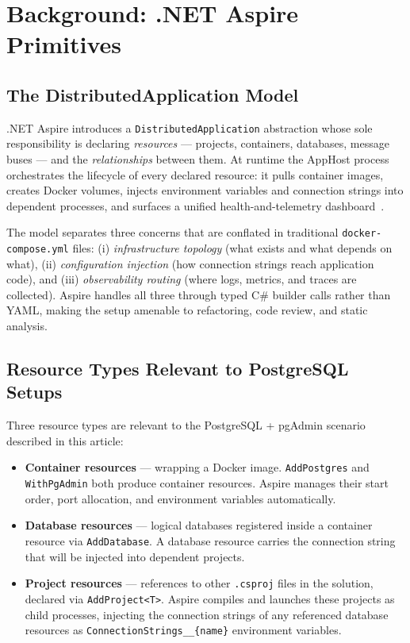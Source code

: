 \section{Background: .NET Aspire Primitives}
\label{sec:background}

\subsection{The DistributedApplication Model}

.NET Aspire introduces a \texttt{DistributedApplication} abstraction whose sole responsibility is declaring \textit{resources} --- projects, containers, databases, message buses --- and the \textit{relationships} between them. At runtime the AppHost process orchestrates the lifecycle of every declared resource: it pulls container images, creates Docker volumes, injects environment variables and connection strings into dependent processes, and surfaces a unified health-and-telemetry dashboard~\cite{aspiredocs2024}.

The model separates three concerns that are conflated in traditional \texttt{docker-compose.yml} files: (i) \textit{infrastructure topology} (what exists and what depends on what), (ii) \textit{configuration injection} (how connection strings reach application code), and (iii) \textit{observability routing} (where logs, metrics, and traces are collected). Aspire handles all three through typed C\# builder calls rather than YAML, making the setup amenable to refactoring, code review, and static analysis.

\subsection{Resource Types Relevant to PostgreSQL Setups}

Three resource types are relevant to the PostgreSQL + pgAdmin scenario described in this article:

\begin{itemize}
  \item \textbf{Container resources} --- wrapping a Docker image. \texttt{AddPostgres} and \texttt{WithPgAdmin} both produce container resources. Aspire manages their start order, port allocation, and environment variables automatically.
  \item \textbf{Database resources} --- logical databases registered inside a container resource via \texttt{AddDatabase}. A database resource carries the connection string that will be injected into dependent projects.
  \item \textbf{Project resources} --- references to other \texttt{.csproj} files in the solution, declared via \texttt{AddProject\textless T\textgreater}. Aspire compiles and launches these projects as child processes, injecting the connection strings of any referenced database resources as \texttt{ConnectionStrings\_\_\{name\}} environment variables.
\end{itemize}

